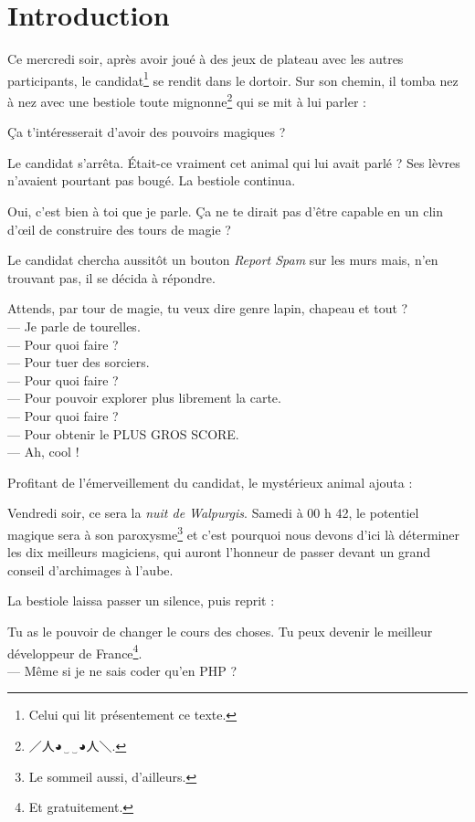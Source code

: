 \section{Introduction}

Ce mercredi soir, après avoir joué à des jeux de plateau avec les autres participants, le candidat\footnote{Celui qui lit présentement ce texte.} se rendit dans le dortoir. Sur son chemin, il tomba nez à nez avec une bestiole toute mignonne\footnote{\J ／人{\A ◕‿‿◕}人＼.} qui se mit à lui parler :

\noindent
\og Ça t'intéresserait d'avoir des pouvoirs magiques ? \fg

Le candidat s'arrêta. Était-ce vraiment cet animal qui lui avait parlé ? Ses lèvres n'avaient pourtant pas bougé. La bestiole continua.

\noindent
\og Oui, c'est bien à toi que je parle. Ça ne te dirait pas d'être capable en un clin d'œil de construire des tours de magie ? \fg

Le candidat chercha aussitôt un bouton \og \emph{Report Spam} \fg{} sur les murs mais, n'en trouvant pas, il se décida à répondre.

\noindent
\og Attends, par tour de magie, tu veux dire genre lapin, chapeau et tout ?\\
--- Je parle de tourelles.\\
--- Pour quoi faire ?\\
--- Pour tuer des sorciers.\\
--- Pour quoi faire ?\\
--- Pour pouvoir explorer plus librement la carte.\\
--- Pour quoi faire ?\\
--- Pour obtenir le PLUS GROS SCORE.\\
--- Ah, cool ! \fg

Profitant de l'émerveillement du candidat, le mystérieux animal ajouta :

\noindent
\og Vendredi soir, ce sera la \emph{nuit de Walpurgis}. Samedi à 00 h 42, le potentiel magique sera à son paroxysme\footnote{Le sommeil aussi, d'ailleurs.} et c'est pourquoi nous devons d'ici là déterminer les dix meilleurs magiciens, qui auront l'honneur de passer devant un grand conseil d'archimages à l'aube. \fg

La bestiole laissa passer un silence, puis reprit :

\og Tu as le pouvoir de changer le cours des choses. Tu peux devenir le meilleur développeur de France\footnote{Et gratuitement.}.\\
--- Même si je ne sais coder qu'en PHP ? \fg

